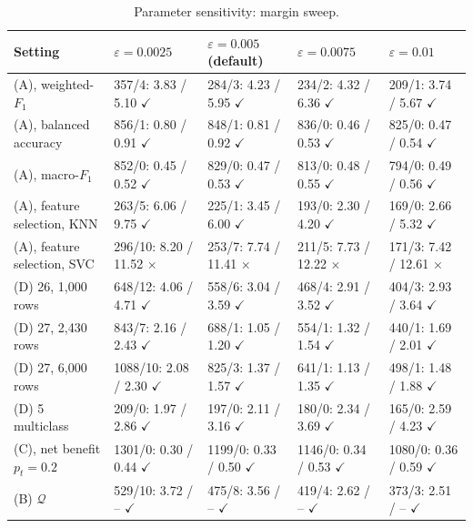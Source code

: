 \begin{table}[!t]
\centering
\scriptsize
{}
\setlength{\tabcolsep}{3pt}
\caption{Parameter sensitivity: margin sweep.}
\label{tab:marginsweep}
\begin{tabular}{@{}lllll@{}}
\toprule
Setting & $\varepsilon=0.0025$ & $\varepsilon=0.005$ (default) & $\varepsilon=0.0075$ & $\varepsilon=0.01$ \\
\midrule
(A), weighted-$F_1$ & 357/4: 3.83 / 5.10 $\checkmark$ & 284/3: 4.23 / 5.95 $\checkmark$ & 234/2: 4.32 / 6.36 $\checkmark$ & 209/1: 3.74 / 5.67 $\checkmark$ \\
(A), balanced accuracy & 856/1: 0.80 / 0.91 $\checkmark$ & 848/1: 0.81 / 0.92 $\checkmark$ & 836/0: 0.46 / 0.53 $\checkmark$ & 825/0: 0.47 / 0.54 $\checkmark$ \\
(A), macro-$F_1$ & 852/0: 0.45 / 0.52 $\checkmark$ & 829/0: 0.47 / 0.53 $\checkmark$ & 813/0: 0.48 / 0.55 $\checkmark$ & 794/0: 0.49 / 0.56 $\checkmark$ \\
(A), feature selection, KNN & 263/5: 6.06 / 9.75 $\checkmark$ & 225/1: 3.45 / 6.00 $\checkmark$ & 193/0: 2.30 / 4.20 $\checkmark$ & 169/0: 2.66 / 5.32 $\checkmark$ \\
(A), feature selection, SVC & 296/10: 8.20 / 11.52 $\times$ & 253/7: 7.74 / 11.41 $\times$ & 211/5: 7.73 / 12.22 $\times$ & 171/3: 7.42 / 12.61 $\times$ \\
(D) 26, 1,000 rows & 648/12: 4.06 / 4.71 $\checkmark$ & 558/6: 3.04 / 3.59 $\checkmark$ & 468/4: 2.91 / 3.52 $\checkmark$ & 404/3: 2.93 / 3.64 $\checkmark$ \\
(D) 27, 2,430 rows & 843/7: 2.16 / 2.43 $\checkmark$ & 688/1: 1.05 / 1.20 $\checkmark$ & 554/1: 1.32 / 1.54 $\checkmark$ & 440/1: 1.69 / 2.01 $\checkmark$ \\
(D) 27, 6,000 rows & 1088/10: 2.08 / 2.30 $\checkmark$ & 825/3: 1.37 / 1.57 $\checkmark$ & 641/1: 1.13 / 1.35 $\checkmark$ & 498/1: 1.48 / 1.88 $\checkmark$ \\
(D) 5 multiclass & 209/0: 1.97 / 2.86 $\checkmark$ & 197/0: 2.11 / 3.16 $\checkmark$ & 180/0: 2.34 / 3.69 $\checkmark$ & 165/0: 2.59 / 4.23 $\checkmark$ \\
(C), net benefit $p_t=0.2$ & 1301/0: 0.30 / 0.44 $\checkmark$ & 1199/0: 0.33 / 0.50 $\checkmark$ & 1146/0: 0.34 / 0.53 $\checkmark$ & 1080/0: 0.36 / 0.59 $\checkmark$ \\
(B) $\mathcal{Q}$ & 529/10: 3.72 / -- $\checkmark$ & 475/8: 3.56 / -- $\checkmark$ & 419/4: 2.62 / -- $\checkmark$ & 373/3: 2.51 / -- $\checkmark$ \\
\bottomrule
\end{tabular}


\end{table}

